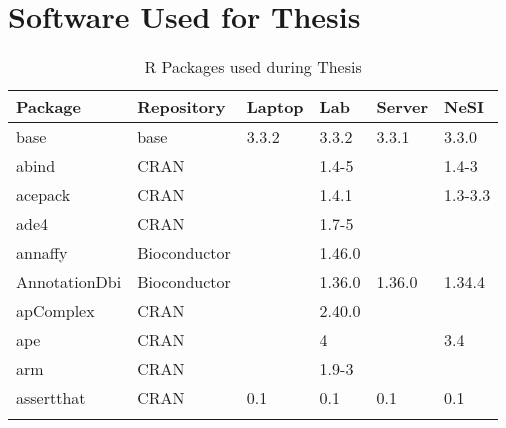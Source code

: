 \chapter{Software Used for Thesis}
\label{appendix:software}

\setlength{\LTleft}{-20cm plus -1fill}
\setlength{\LTright}{\LTleft}

\begin{longtable}{|llllll|}
\caption{R Packages used during Thesis}
\label{tab:computers_r_packages_full}
\\
\multicolumn{1}{l}{Package}  & \multicolumn{1}{l}{Repository}  & \multicolumn{1}{l}{Laptop}      & \multicolumn{1}{l}{Lab}         & \multicolumn{1}{l}{Server}         & \multicolumn{1}{l}{NeSI} \\ \hline \rowcolor{gray!25}
base                          & base                      & 3.3.2       & 3.3.2       & 3.3.1          & 3.3.0            \\ \hline
abind                         & CRAN                      &             & 1.4-5       &                & 1.4-3             \\ \hline \rowcolor{gray!25}
acepack                       & CRAN                      &             & 1.4.1       &                & 1.3-3.3          \\ \hline
ade4                          & CRAN                      &             & 1.7-5       &                &                   \\ \hline \rowcolor{gray!25}
annaffy                       & Bioconductor              &             & 1.46.0      &                &                  \\ \hline
AnnotationDbi                 & Bioconductor              &             & 1.36.0      & 1.36.0         & 1.34.4            \\ \hline \rowcolor{gray!25}
apComplex                     & CRAN                      &             & 2.40.0      &                &                  \\ \hline
ape                           & CRAN                      &             & 4           &                & 3.4               \\ \hline \rowcolor{gray!25}
arm                           & CRAN                      &             & 1.9-3       &                &                  \\ \hline
assertthat                    & CRAN                      & 0.1         & 0.1         & 0.1            & 0.1               \\ \hline \rowcolor{gray!25}

\end{longtable}
